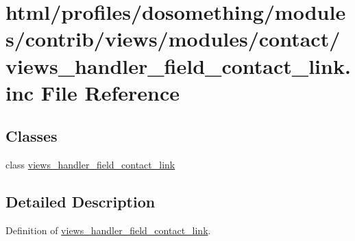 \hypertarget{views__handler__field__contact__link_8inc}{
\section{html/profiles/dosomething/modules/contrib/views/modules/contact/views\_\-handler\_\-field\_\-contact\_\-link.inc File Reference}
\label{views__handler__field__contact__link_8inc}
}
\subsection*{Classes}
\begin{DoxyCompactItemize}
\item 
class \hyperlink{classviews__handler__field__contact__link}{views\_\-handler\_\-field\_\-contact\_\-link}
\end{DoxyCompactItemize}


\subsection{Detailed Description}
Definition of \hyperlink{classviews__handler__field__contact__link}{views\_\-handler\_\-field\_\-contact\_\-link}. 